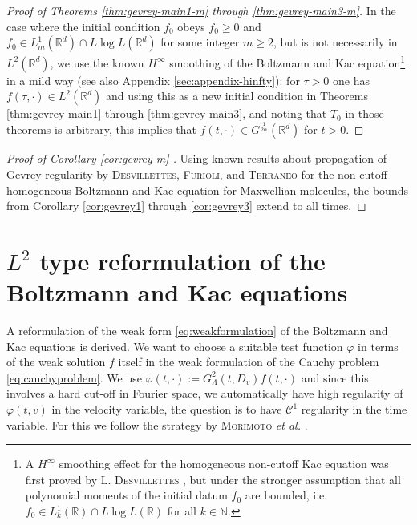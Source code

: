 \documentclass[11pt,a4paper,reqno]{amsart}
\theoremstyle{plain}
\theoremstyle{definition}
\begin{document}
\begin{proof}[Proof of Theorems \ref{thm:gevrey-main1-m} through \ref{thm:gevrey-main3-m}]
	In the case where the initial condition $f_0$ obeys $f_0\ge 0$ and $f_0\in L^1_m({\mathbb{R}}^d)\cap L\log L({\mathbb{R}}^d)$ for some integer $m\ge 2$, but
	is not necessarily in $L^2({\mathbb{R}}^d)$, we use the known $H^\infty$ smoothing of
	the Boltzmann \cite{DW10, AE05, MUXY09} and Kac equation\footnote{A $H^{\infty}$ smoothing effect for the homogeneous non-cutoff Kac equation was first proved by \textsc{L. Desvillettes} \cite{Des95}, but under the stronger assumption that all polynomial moments of the initial datum $f_0$ are bounded, i.e. $f_0\in L^1_k({\mathbb{R}})\cap L\log L({\mathbb{R}})$ for all $k\in{\mathbb{N}}$.} \cite{LX09} in a mild way (see also Appendix \ref{sec:appendix-hinfty}):
	for $\tau>0$ one has $f(\tau,\cdot)\in L^2({\mathbb{R}}^d)$
	and using this as a new initial condition in Theorems \ref{thm:gevrey-main1} through \ref{thm:gevrey-main3}, and noting that $T_0$ in those theorems is arbitrary, this implies that $f(t,\cdot) \in G^{\frac{1}{2\alpha}}({\mathbb{R}}^d)$
	for $t>0$.
\end{proof}

\begin{proof}[Proof of Corollary \ref{cor:gevrey-m} ]
	Using known results about propagation of Gevrey regularity by \textsc{Desvillettes}, \textsc{Furioli}, and \textsc{Terraneo} \cite{DFT09} for the non-cutoff homogeneous Boltzmann and Kac equation for Maxwellian molecules, the bounds from Corollary \ref{cor:gevrey1} through \ref{cor:gevrey3}  extend to all times.
\end{proof}

\appendix

\section{$L^2$ type reformulation of the Boltzmann and Kac equations}\label{sec:appendix-reformulation}

A reformulation of the weak form \eqref{eq:weakformulation} of the Boltzmann and Kac equations is derived. We want to choose a suitable test function $\varphi$ in terms of the weak solution $f$ itself in the weak formulation of the Cauchy problem \eqref{eq:cauchyproblem}. We use $\varphi(t,\cdot):= G_\Lambda^2(t,D_v)f(t,\cdot)$ and since this involves a hard cut-off in Fourier space, we automatically have high regularity  of $\varphi(t,v)$ in the velocity variable, the question is to have $\mathcal{C}^1$ regularity in the time variable. For this we follow the strategy by \textsc{Morimoto} \textit{et al.} \cite{MUXY09}.
\end{document}
